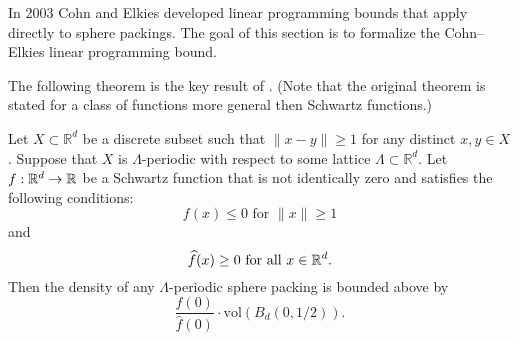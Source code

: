 In 2003 Cohn and Elkies \cite{ElkiesCohn}  developed  linear programming bounds that apply directly to sphere packings. The goal of this section is to formalize the Cohn--Elkies linear programming bound.

The following theorem is the key result of \cite{ElkiesCohn}. (Note that the original theorem is stated for a class of functions more general then Schwartz functions.)
\begin{theorem}\label{thm:Cohn-Elkies-periodic}\leanok

Let $X\subset\mathbb{R}^d$ be a discrete subset such that $\|x-y\|\geq 1$ for any distinct $x,y\in X$. Suppose that $X$ is $\Lambda$-periodic with respect to some lattice $\Lambda\subset\mathbb{R}^d$. Let $f:\mathbb{R}^d\to\mathbb{R}$ be a Schwartz function that is not identically zero and satisfies the following conditions:
\begin{equation}\label{eqn:Cohn-Elkies-condition-1}f(x)\leq 0\mbox{ for } \|x\|\geq 1\end{equation} and
\begin{equation}\label{eqn:Cohn-Elkies-condition-2}\widehat{f}(x)\geq0\mbox{ for all } x\in\mathbb{R}^d.\end{equation}
  Then the density of any $\Lambda$-periodic sphere packing is bounded above by $$\frac{f(0)}{\widehat{f}(0)}\cdot \mathrm{vol}(B_d(0,1/2)).$$
\end{theorem}

